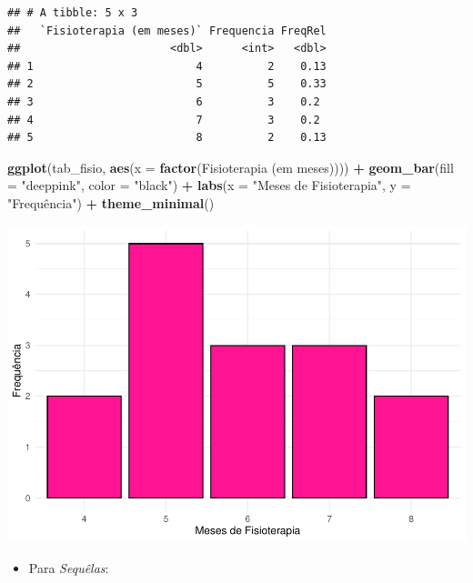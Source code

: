 \documentclass[
]{book}
\newenvironment{Shaded}{\begin{snugshade}}{\end{snugshade}}
\newcommand{\AttributeTok}[1]{\textcolor[rgb]{0.13,0.29,0.53}{#1}}
\newcommand{\FunctionTok}[1]{\textcolor[rgb]{0.13,0.29,0.53}{\textbf{#1}}}
\newcommand{\NormalTok}[1]{#1}
\newcommand{\SpecialCharTok}[1]{\textcolor[rgb]{0.81,0.36,0.00}{\textbf{#1}}}
\newcommand{\StringTok}[1]{\textcolor[rgb]{0.31,0.60,0.02}{#1}}
\providecommand{\tightlist}{%
  \setlength{\itemsep}{0pt}\setlength{\parskip}{0pt}}
\begin{document}
\begin{verbatim}
## # A tibble: 5 x 3
##   `Fisioterapia (em meses)` Frequencia FreqRel
##                       <dbl>      <int>   <dbl>
## 1                         4          2    0.13
## 2                         5          5    0.33
## 3                         6          3    0.2 
## 4                         7          3    0.2 
## 5                         8          2    0.13
\end{verbatim}

\begin{Shaded}
\begin{Highlighting}[]
\FunctionTok{ggplot}\NormalTok{(tab\_fisio, }\FunctionTok{aes}\NormalTok{(}\AttributeTok{x =} \FunctionTok{factor}\NormalTok{(}\StringTok{\textasciigrave{}}\AttributeTok{Fisioterapia (em meses)}\StringTok{\textasciigrave{}}\NormalTok{))) }\SpecialCharTok{+}
  \FunctionTok{geom\_bar}\NormalTok{(}\AttributeTok{fill =} \StringTok{"deeppink"}\NormalTok{, }\AttributeTok{color =} \StringTok{"black"}\NormalTok{) }\SpecialCharTok{+}
  \FunctionTok{labs}\NormalTok{(}\AttributeTok{x =} \StringTok{"Meses de Fisioterapia"}\NormalTok{, }\AttributeTok{y =} \StringTok{"Frequência"}\NormalTok{) }\SpecialCharTok{+}
  \FunctionTok{theme\_minimal}\NormalTok{()}
\end{Highlighting}
\end{Shaded}

\begin{center}\includegraphics{AED_files/figure-latex/cap6_ex1bf-1} \end{center}

\begin{itemize}
\tightlist
\item
  Para \emph{Sequêlas}:
\end{itemize}
\end{document}
